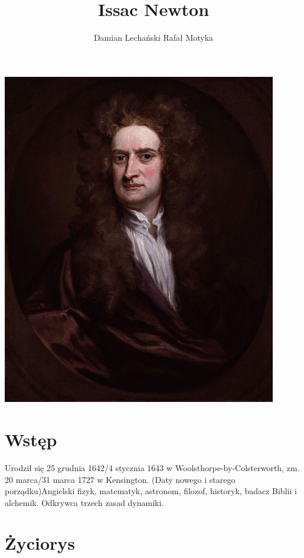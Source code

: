 \documentclass{article}
\title{\textbf{Issac Newton}}
\author{Damian Lechański \break Rafał Motyka}
\begin{document}
\maketitle

\centerline{\includegraphics[width=120mm,scale=0.6]{images/Newton.jpg}}



\newpage
\section{Wstęp}
Urodził się 25 grudnia 1642/4 stycznia 1643 w Woolsthorpe-by-Colsterworth, zm. 20 marca/31 marca 1727 w Kensington. (Daty nowego i starego porządku)\newline Angielski fizyk, matematyk, astronom, filozof, historyk, badacz Biblii i alchemik. Odkrywca trzech zasad dynamiki.

\section{Życiorys}
\end{document}
